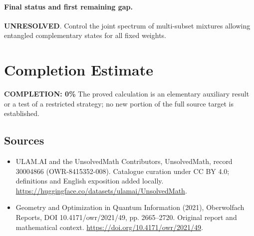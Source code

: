 \documentclass[11pt]{article}
\begin{document}
\paragraph{Final status and first remaining gap.}
\textbf{UNRESOLVED}. Control the joint spectrum of multi-subset mixtures allowing entangled complementary states for all fixed weights.

\section{Completion Estimate}
\noindent\textbf{COMPLETION: 0\%}
The proved calculation is an elementary auxiliary result or a test of a restricted strategy; no new portion of the full source target is established.

\subsection{Sources}
\begin{itemize}
\item[\hypertarget{source:30004866:1}{S1}] ULAM.AI and the UnsolvedMath Contributors, UnsolvedMath, record 30004866 (OWR-8415352-008). Catalogue curation under CC BY 4.0; definitions and English exposition added locally.
\url{https://huggingface.co/datasets/ulamai/UnsolvedMath}.
\item[\hypertarget{source:30004866:2}{S2}] Geometry and Optimization in Quantum Information (2021), Oberwolfach Reports, DOI 10.4171/owr/2021/49, pp. 2665--2720. Original report and mathematical context.
\url{https://doi.org/10.4171/owr/2021/49}.
\end{itemize}
\label{end:30004866}
\end{document}
